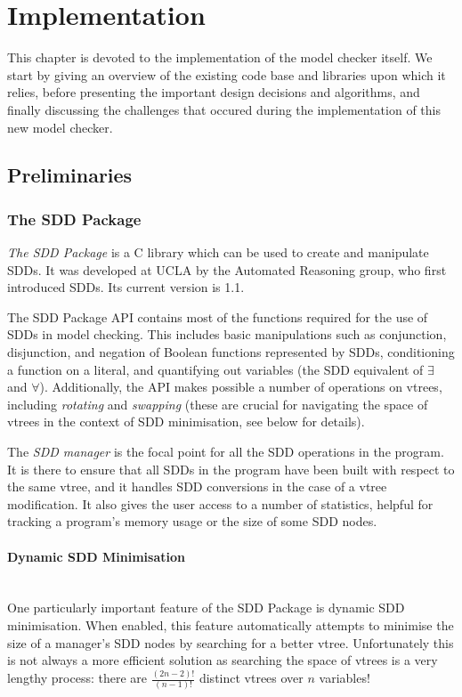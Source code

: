 \documentclass[12]{article}
\newcommand{\myparagraph}[1]{\paragraph{#1}\mbox{}\\}
\begin{document}
\section{Implementation}

This chapter is devoted to the implementation of the model checker itself. We start by giving an overview of the existing code base and libraries upon which it relies, before presenting the important design decisions and algorithms, and finally discussing the challenges that occured during the implementation of this new model checker. 

\subsection{Preliminaries}
\subsubsection{The SDD Package}

\textit{The SDD Package} is a C library which can be used to create and manipulate SDDs. It was developed at UCLA by the Automated Reasoning group, who first introduced SDDs. Its current version is 1.1.  


The SDD Package API contains most of the functions required for the use of SDDs in model checking. This includes basic manipulations such as conjunction, disjunction, and negation of Boolean functions represented by SDDs, conditioning a function on a literal, and quantifying out variables (the SDD equivalent of $\exists$ and $\forall$). Additionally, the API makes possible a number of operations on vtrees, including \textit{rotating }and \textit{swapping} (these are crucial for navigating the space of vtrees in the context of SDD minimisation, see below for details). 

The \textit{SDD manager} is the focal point for all the SDD operations in the program. It is there to ensure that all SDDs in the program have been built with respect to the same vtree, and it handles SDD conversions in the case of a vtree modification. It also gives the user access to a number of statistics, helpful for tracking a program's memory usage or the size of some SDD nodes. 

\myparagraph{Dynamic SDD Minimisation}

One particularly important feature of the SDD Package is dynamic SDD minimisation. When enabled, this feature automatically attempts to minimise the size of a manager's SDD nodes by searching for a better vtree. Unfortunately this is not always a more efficient solution as searching the space of vtrees is a very lengthy process: there are $\frac{(2n -2)!}{(n-1)!}$ distinct vtrees over $n$ variables!
\end{document}
